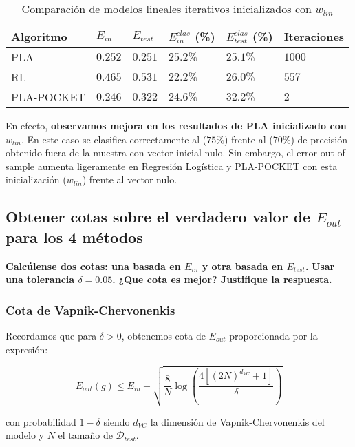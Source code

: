 \begin{table}[H]
    \centering
    \begin{tabular}{llllll} \toprule
        Algoritmo & $E_{in}$ & $E_{test}$ & $E_{in}^{clas}$ (\%) & $E_{test}^{clas}$ (\%) & Iteraciones \\ \midrule
        PLA & $0.252$ & $0.251$ & $25.2 \%$ & $25.1 \%$ & $1000$ \\
        RL & $0.465$ & $0.531$ & $22.2 \%$ & $26.0 \%$ & $557$ \\
        PLA-POCKET & $0.246$ & $0.322$ & $24.6 \%$ & $32.2 \%$ & $2$ \\ \bottomrule
    \end{tabular}
    \caption{Comparación de modelos lineales iterativos inicializados con $w_{lin}$}
\end{table}

En efecto, \textbf{observamos mejora en los resultados de PLA inicializado con $w_{lin}$}.
En este caso se clasifica correctamente al ($75\%$) frente al ($70\%$)
de precisión obtenido fuera de la muestra con vector inicial nulo.
Sin embargo, el error out of sample aumenta ligeramente en Regresión Logística y
PLA-POCKET con esta inicialización ($w_{lin}$) frente al vector nulo.

\subsection{Obtener cotas sobre el verdadero valor de $E_{out}$ para los 4 métodos}

\textbf{Calcúlense dos cotas: una basada en $E_{in}$ y otra basada en $E_{test}$.}
\textbf{Usar una tolerancia $\delta=0.05$.}
\textbf{¿Que cota es mejor? Justifique la respuesta.}

\subsubsection{Cota de Vapnik-Chervonenkis}

Recordamos que para $\delta > 0$, obtenemos cota de $E_{out}$ proporcionada por la expresión:

\begin{equation}
E_{out}(g) \leq E_{in} + \sqrt{\frac{8}{N}\log{\left( \frac{4 [(2N)^{d_{VC}} + 1]}{\delta} \right)}}
\end{equation}

con probabilidad $1 - \delta$ siendo $d_{VC}$ la dimensión de Vapnik-Chervonenkis del modelo y
$N$ el tamaño de $\mathcal{D}_{test}$. 

